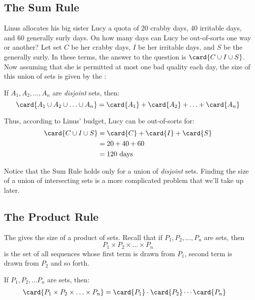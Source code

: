 
\subsection{The Sum Rule}

Linus allocates his big sister Lucy a quota of 20 crabby days, 40
irritable days, and 60 generally surly days.  On how many days can
Lucy be out-of-sorts one way or another?  Let set $C$ be her crabby
days, $I$ be her irritable days, and $S$ be the generally surly.  In
these terms, the answer to the question is $\card{C \cup I \cup S}$.
Now assuming that she is permitted at most one bad quality each day,
the size of this union of sets is given by the :

\begin{mathrule}
If $A_1, A_2, \ldots, A_n$ are \emph{disjoint} sets, then:
%
\[
\card{A_1 \cup A_2 \cup \ldots \cup A_n}
    = \card{A_1} + \card{A_2} + \ldots + \card{A_n}
\]
\end{mathrule}

Thus, according to Linus' budget, Lucy can be out-of-sorts for:
%
\begin{align*}
\card{C \cup I \cup S}
    & = \card{C} + \card{I} + \card{S} \\
    & = 20 + 40 + 60 \\
    & = 120 \text{ days}
\end{align*}

Notice that the Sum Rule holds only for a union of {\em disjoint}
sets.  Finding the size of a union of intersecting sets is a more
complicated problem that we'll take up later.

\subsection{The Product Rule}

The  gives the size of a product of sets.  Recall that
if $P_1, P_2, \ldots, P_n$ are sets, then
%
\[
P_1 \times P_2 \times \ldots \times P_n
\]
%
is the set of all sequences whose first term is drawn from $P_1$,
second term is drawn from $P_2$ and so forth.

\begin{mathrule}
If $P_1, P_2, \ldots P_n$ are sets, then:
%
\begin{align*}
\card{P_1 \times P_2 \times \ldots \times P_n}
    & = \card{P_1} \cdot \card{P_2} \cdots \card{P_n}
\end{align*}
\end{mathrule}

